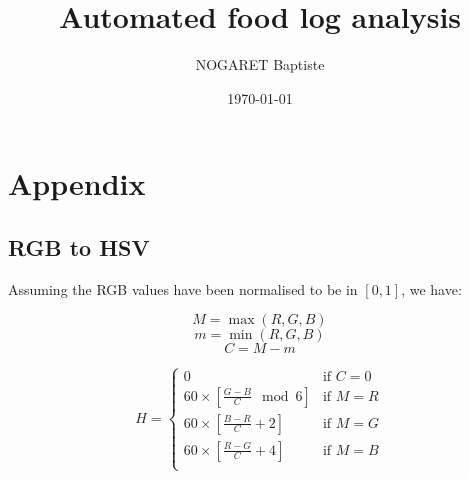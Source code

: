 \documentclass[12pt]{book}
\title{Automated food log analysis}
\author{NOGARET Baptiste}
\date{\today}
\begin{document}
\frontmatter

\maketitle





\sstableofcontents

\sslistoffigures

\sslistoftables





%
%
\mainmatter




















%
%
\appendix

\chapter{Appendix}

\section{RGB to HSV}

Assuming the RGB values have been normalised to be in $[0, 1]$, we have:

$$M = \max (R, G, B)$$
$$m = \min (R, G, B)$$
$$C = M - m$$

$$
H =
\begin{cases}
0 & \text{if $C = 0$}\\
60 \times \left[ \frac{G - B}{C} \mod 6\right] & \text{if $M = R$} \\
60 \times \left[ \frac{B - R}{C} + 2\right] & \text{if $M = G$} \\
60 \times \left[ \frac{R - G}{C} + 4\right] & \text{if $M = B$} \\
\end{cases}
$$
\end{document}
